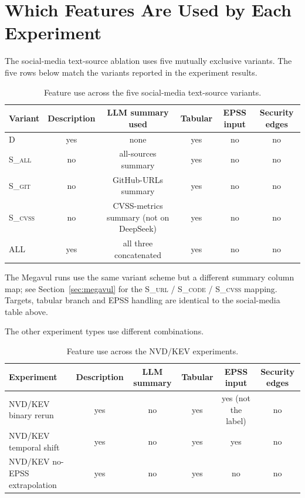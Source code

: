 \documentclass[11pt]{article}
\begin{document}
\section{Which Features Are Used by Each Experiment}

The social-media text-source ablation uses five mutually exclusive
variants. The five rows below match the variants reported in the
experiment results.

\begin{table}[h]
\centering
\small
\begin{tabular}{lccccc}
\toprule
Variant & Description & LLM summary used & Tabular & EPSS input & Security edges \\
\midrule
\textsc{D}      & yes & none                                        & yes & no & no \\
\textsc{S\_all} & no  & all-sources summary                         & yes & no & no \\
\textsc{S\_git} & no  & GitHub-URLs summary                         & yes & no & no \\
\textsc{S\_cvss}& no  & CVSS-metrics summary (not on DeepSeek)      & yes & no & no \\
\textsc{ALL}    & yes & all three concatenated                      & yes & no & no \\
\bottomrule
\end{tabular}
\caption{Feature use across the five social-media text-source variants.}
\end{table}

The Megavul runs use the same variant scheme but a different summary
column map; see Section~\ref{sec:megavul} for the
\textsc{S\_url} / \textsc{S\_code} / \textsc{S\_cvss} mapping.
Targets, tabular branch and EPSS handling are identical to the
social-media table above.

The other experiment types use different combinations.

\begin{table}[h]
\centering
\small
\begin{tabular}{lccccc}
\toprule
Experiment & Description & LLM summary & Tabular & EPSS input & Security edges \\
\midrule
NVD/KEV binary rerun         & yes & no  & yes      & yes (not the label) & no \\
NVD/KEV temporal shift       & yes & no  & yes      & yes                 & no \\
NVD/KEV no-EPSS extrapolation & yes & no  & yes      & no                  & no \\
\bottomrule
\end{tabular}
\caption{Feature use across the NVD/KEV experiments.}
\end{table}
\end{document}
